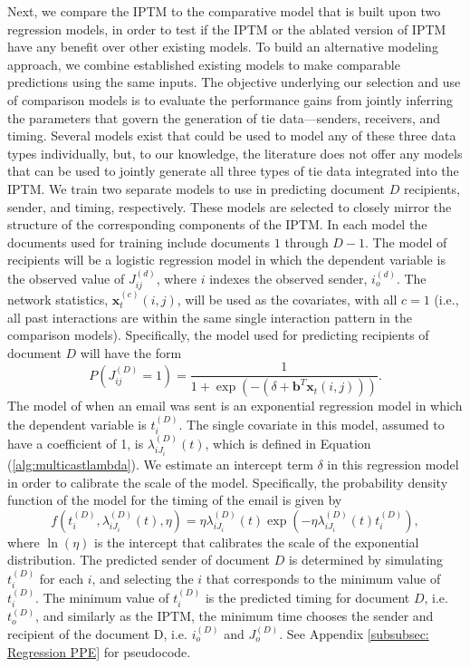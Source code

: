Next, we compare the IPTM to the comparative model that is built upon two regression models, in order to test if the IPTM or the ablated version of IPTM have any benefit over other existing models. To build an alternative modeling approach, we combine established existing models to make comparable predictions using the same inputs. The objective underlying our selection and use of comparison models is to evaluate the performance gains from jointly inferring the parameters that govern the generation of tie data---senders, receivers, and timing. Several models exist that could be used to model any of these three data types individually, but, to our knowledge, the literature does not offer any models that can be used to jointly generate all three types of tie data integrated into the IPTM. We train two separate models to use in predicting document $D$ recipients, sender, and timing, respectively. These models are selected to closely mirror the structure of the corresponding components of the IPTM. In each model the documents used for training include documents $1$ through $D-1$. The model of recipients will be a logistic regression model in which the dependent variable is the observed value of $J^{(d)}_{ij}$, where $i$ indexes the observed sender, $i_o^{(d)}$. The network statistics, $\boldsymbol{x}^{(c)}_t(i, j)$, will be used as the covariates, with all $c=1$ (i.e., all past interactions are within the same single interaction pattern in the comparison models). Specifically, the model used for predicting recipients of document $D$ will have the form 
\begin{equation}
P(J^{(D)}_{ij}=1)=\frac{1}{1+\exp\left(-(\delta+\boldsymbol{b}^T\boldsymbol{x}_t(i, j))\right)}.
\label{eqn:predrec}
\end{equation}
The model of when an email was sent is an exponential regression model in which the dependent variable is $t_i^{(D)}$. The single covariate in this model, assumed to have a coefficient of 1, is $\lambda_{iJ_i}^{(D)}(t)$, which is defined in Equation (\ref{alg:multicastlambda}). We estimate an intercept term $\delta$ in this regression model in order to calibrate the scale of the model. Specifically, the probability density function of the model for the timing of the email is given by
\begin{equation}
f(t_i^{(D)},\lambda_{iJ_i}^{(D)}(t),\eta) = \eta\lambda_{iJ_i}^{(D)}(t)\exp(- \eta\lambda_{iJ_i}^{(D)}(t)t_i^{(D)}),
\label{eqn:predtime}
\end{equation}
where $\ln(\eta)$ is the intercept that calibrates the scale of the exponential distribution. The predicted sender of document $D$ is determined by simulating $t_i^{(D)}$ for each $i$, and selecting the $i$ that corresponds to the minimum value of $t_i^{(D)}$. The minimum value of $t_i^{(D)}$ is the predicted timing for document $D$, i.e. $t_o^{(D)}$, and similarly as the IPTM, the minimum time chooses the sender and recipient of the document D, i.e. $i_o^{(D)}$ and $J_o^{(D)}$. See Appendix \ref{subsubsec: Regression PPE} for pseudocode.

